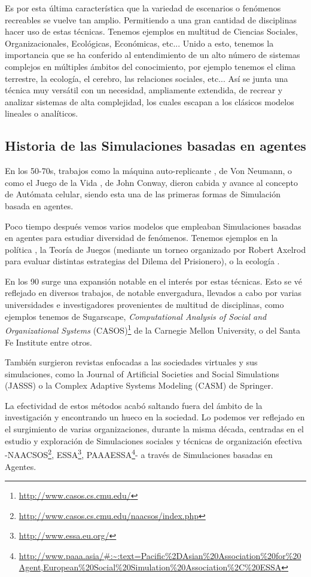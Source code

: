 Es por esta última característica que la variedad de escenarios o fenómenos recreables se vuelve tan amplio. Permitiendo a una gran cantidad de disciplinas hacer uso de estas técnicas. Tenemos ejemplos en multitud de Ciencias Sociales, Organizacionales, Ecológicas, Económicas, etc...
Unido a esto, tenemos la importancia que se ha conferido al entendimiento de un alto número de sistemas complejos en múltiples ámbitos del conocimiento, por ejemplo tenemos el clima terrestre, la ecología, el cerebro, las relaciones sociales, etc...
Así se junta una técnica muy versátil con un necesidad, ampliamente extendida, de recrear y analizar sistemas de alta complejidad, los cuales escapan a los clásicos modelos lineales o analíticos.

\subsection{Historia de las Simulaciones basadas en agentes}

En los 50-70s, trabajos como la máquina auto-replicante \cite{neumann1966theory} , de Von Neumann, o como el Juego de la Vida \cite{gardner1970fantastic}, de John Conway, dieron cabida y avance al concepto de Autómata celular, siendo esta una de las primeras formas de Simulación basada en agentes.

Poco tiempo después vemos varios modelos que empleaban Simulaciones basadas en agentes para estudiar diversidad de fenómenos. Tenemos ejemplos en la política \cite{schelling1971dynamic}, la Teoría de Juegos (mediante un torneo organizado por Robert Axelrod para evaluar distintas estrategias del Dilema del Prisionero), o la ecología \cite{hogeweg1983ontogeny}.

En los 90 surge una expansión notable en el interés por estas técnicas. Esto se vé reflejado en diversos trabajos, de notable envergadura, llevados a cabo por varias universidades e investigadores provenientes de multitud de disciplinas, como ejemplos tenemos \cite{epstein1996growing} de Sugarscape, \textit{Computational Analysis of Social and Organizational Systems} (CASOS)\footnote{\url{http://www.casos.cs.cmu.edu/}} de la Carnegie Mellon University, o \cite{kohler2000dynamics} del Santa Fe Institute  entre otros.

También surgieron revistas enfocadas a las sociedades virtuales y sus simulaciones, como la Journal of Artificial Societies and Social Simulations (JASSS) o la Complex Adaptive Systems Modeling (CASM) de Springer.

La efectividad de estos métodos acabó saltando fuera del ámbito de la investigación y encontrando un hueco en la sociedad. Lo podemos ver reflejado en el surgimiento de varias organizaciones, durante la misma década, centradas en el estudio y exploración de Simulaciones sociales y técnicas de organización efectiva -NAACSOS\footnote{\url{http://www.casos.cs.cmu.edu/naacsos/index.php}}, ESSA\footnote{\url{http://www.essa.eu.org/}}, PAAAESSA\footnote{\url{http://www.paaa.asia/\#:~:text=Pacific\%2DAsian\%20Association\%20for\%20Agent,European\%20Social\%20Simulation\%20Association\%2C\%20ESSA}}- a través de Simulaciones basadas en Agentes.

